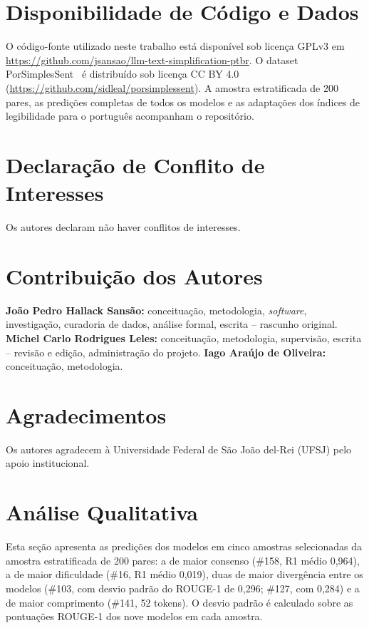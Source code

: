 \documentclass[a4paper, twocolumn, 11pt, twoside]{article}
\begin{document}
\section*{Disponibilidade de Código e Dados}

O código-fonte utilizado neste trabalho está disponível sob licença
GPLv3 em \url{https://github.com/jsansao/llm-text-simplification-ptbr}.
O dataset PorSimplesSent~\citep{caseli2009} é distribuído sob
licença CC BY 4.0
(\url{https://github.com/sidleal/porsimplessent}).
A amostra estratificada de 200 pares, as predições completas de
todos os modelos e as adaptações dos índices de legibilidade para o
português acompanham o repositório.

\section*{Declaração de Conflito de Interesses}
Os autores declaram não haver conflitos de interesses.

\section*{Contribuição dos Autores}
\textbf{João Pedro Hallack Sansão:} conceituação, metodologia, \emph{software},
investigação, curadoria de dados, análise formal, escrita -- rascunho original.
\textbf{Michel Carlo Rodrigues Leles:} conceituação, metodologia, supervisão,
escrita -- revisão e edição, administração do projeto.
\textbf{Iago Araújo de Oliveira:} conceituação, metodologia.

\section*{Agradecimentos}
Os autores agradecem à Universidade Federal de São João del-Rei (UFSJ)
pelo apoio institucional.



\appendix
\section{Análise Qualitativa}
\label{apendice:qualitativa}

Esta seção apresenta as predições dos modelos em cinco amostras
selecionadas da amostra estratificada de 200 pares: a de maior consenso
(\#158, R1 médio 0,964), a de maior dificuldade (\#16, R1 médio 0,019),
duas de maior divergência entre os modelos (\#103, com desvio padrão
do ROUGE-1 de 0,296; \#127, com 0,284) e a de maior comprimento
(\#141, 52 tokens). O desvio padrão é calculado sobre as pontuações
ROUGE-1 dos nove modelos em cada amostra.
\end{document}
